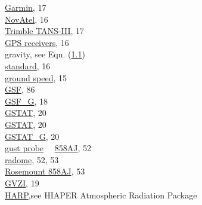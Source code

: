 \documentclass[
]{book}
\begin{document}
\hspace*{0.333em}\hspace*{0.333em}\href{./3-the-state-of-the-aircraft.html\#gglat}{Garmin}, 17\\
\hspace*{0.333em}\hspace*{0.333em}\href{./3-the-state-of-the-aircraft.html\#gglat}{NovAtel}, 16\\
\hspace*{0.333em}\hspace*{0.333em}\href{./3-the-state-of-the-aircraft.html\#gglat}{Trimble TANS-III}, 17\\
\href{./3-the-state-of-the-aircraft.html\#global-positioning-systems}{GPS receivers}, 16\\
gravity, see Eqn. (\href{./1-introduction.html\#eq:gsublambda}{1.1})\\
\hspace*{0.333em}\hspace*{0.333em}\href{./3-the-state-of-the-aircraft.html\#palt}{standard}, 16\\
\href{./3-the-state-of-the-aircraft.html\#ggspd}{ground speed}, 15\\
\href{./3-the-state-of-the-aircraft.html\#gsf}{GSF}, 86\\
\href{./3-the-state-of-the-aircraft.html\#ggspd}{GSF\_G}, 18\\
\href{./3-the-state-of-the-aircraft.html\#ggstatus\%7C}{GSTAT}, 20\\
\href{./3-the-state-of-the-aircraft.html\#ggstatus}{GSTAT}, 20\\
\href{./3-the-state-of-the-aircraft.html\#ggstatus\%7C}{GSTAT\_G}, 20\\
\href{./4-the-state-of-the-atmosphere.html\#variable-names}{gust probe}
~~\href{./4-the-state-of-the-atmosphere.html\#relative-wind}{858AJ}, 52\\
\hspace*{0.333em}\hspace*{0.333em}\href{./4-the-state-of-the-atmosphere.html\#relative-wind}{radome}, 52, 53\\
\hspace*{0.333em}\hspace*{0.333em}\href{./4-the-state-of-the-atmosphere.html\#relative-wind}{Rosemount 858AJ}, 53\\
\href{./3-the-state-of-the-aircraft.html\#ggvspd}{GVZI}, 19\\
\href{./8-radiation-variables.html\#harp}{HARP},see HIAPER Atmospheric Radiation Package\\
\end{document}
